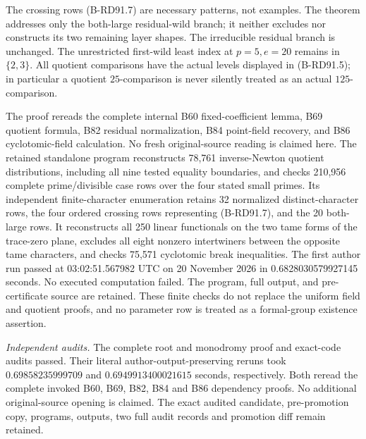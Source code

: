 \begin{remark}
\label{rem:B-RD91-scope}
The crossing rows (B-RD91.7) are necessary patterns, not examples.
The theorem addresses only the both-large residual-wild branch;
it neither excludes nor constructs its two remaining layer shapes.
The irreducible residual branch is unchanged. The unrestricted
first-wild least index at \(p=5,e=20\) remains in \(\{2,3\}\).
All quotient comparisons have the actual levels displayed in
(B-RD91.5); in particular a quotient \(25\)-comparison is never
silently treated as an actual \(125\)-comparison.

The proof rereads the complete internal B60 fixed-coefficient
lemma, B69 quotient formula, B82 residual normalization, B84
point-field recovery, and B86 cyclotomic-field calculation.
No fresh original-source reading is claimed here. The retained
standalone program
reconstructs 78,761 inverse-Newton quotient distributions, including
all nine tested equality boundaries, and checks 210,956 complete
prime/divisible case rows over the four stated small primes.
Its independent finite-character enumeration retains 32 normalized
distinct-character rows, the four ordered crossing rows representing
(B-RD91.7), and the 20 both-large rows. It reconstructs all 250
linear functionals on the two tame forms of the trace-zero plane,
excludes all eight nonzero intertwiners between the opposite tame
characters, and checks 75,571 cyclotomic break inequalities.
The first author run passed at 03:02:51.567982 UTC on 20 November
2026 in 0.6828030579927145 seconds. No executed computation failed.
The program, full output, and pre-certificate source are retained.
These finite checks do not replace the uniform field and quotient
proofs, and no parameter row is treated as a formal-group existence
assertion.

\smallskip
\noindent\emph{Independent audits.}
The complete root and monodromy proof and exact-code audits passed.
Their literal author-output-preserving reruns took
\(0.69858235999709\) and
\(0.6949913400021615\) seconds, respectively.
Both reread the complete invoked B60, B69, B82, B84 and B86
dependency proofs. No additional original-source opening is claimed.
The exact audited candidate, pre-promotion copy, programs, outputs,
two full audit records and promotion diff remain retained.
\end{remark}
